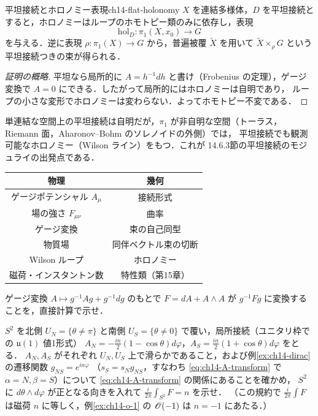 \begin{myprop}{平坦接続とホロノミー表現}{ch14-flat-holonomy}
$X$ を連結多様体，$D$ を平坦接続とすると，ホロノミーはループのホモトピー類のみに依存し，表現
\begin{equation}
  \mathrm{hol}_D:\pi_1(X,x_0)\to G
\end{equation}
を与える．逆に表現 $\rho:\pi_1(X)\to G$ から，普遍被覆 $\tilde X$ を用いて $\tilde X\times_\rho G$ という平坦接続つきの束が得られる．
\end{myprop}
\begin{proof}[証明の概略]
平坦なら局所的に $A=h^{-1}dh$ と書け（Frobenius の定理），ゲージ変換で $A=0$ にできる．したがって局所的にはホロノミーは自明であり，
ループの小さな変形でホロノミーは変わらない．よってホモトピー不変である．
\end{proof}
単連結な空間上の平坦接続は自明だが，$\pi_1$ が非自明な空間（トーラス，Riemann 面，Aharonov--Bohm のソレノイドの外側）では，
平坦接続でも観測可能なホロノミー（Wilson ライン）をもつ．これが 14.6.3節の平坦接続のモジュライの出発点である．

\begin{physbox}
\begin{center}
\begin{tabular}{c|c}
物理 & 幾何 \\ \hline
ゲージポテンシャル $A_\mu$ & 接続形式 \\
場の強さ $F_{\mu\nu}$ & 曲率 \\
ゲージ変換 & 束の自己同型 \\
物質場 & 同伴ベクトル束の切断 \\
Wilson ループ & ホロノミー \\
磁荷・インスタントン数 & 特性類（第15章）
\end{tabular}
\end{center}
\end{physbox}

ゲージ変換 $A\mapsto g^{-1}Ag+g^{-1}dg$ のもとで $F=dA+A\wedge A$ が $g^{-1}Fg$ に変換することを，直接計算で示せ．

$S^2$ を北側 $U_N=\{\theta\neq\pi\}$ と南側 $U_S=\{\theta\neq0\}$ で覆い，局所接続（ユニタリ枠での $\mathfrak{u}(1)$ 値1形式）
$A_N = -\frac{in}{2}(1-\cos\theta)d\varphi$，$A_S=\frac{in}{2}(1+\cos\theta)d\varphi$ をとる．
$A_N,A_S$ がそれぞれ $U_N,U_S$ 上で滑らかであること，および例\ref{ex:ch14-dirac} の遷移関数 $g_{NS}=e^{in\varphi}$
（$s_S=s_Ng_{NS}$，すなわち \eqref{eq:ch14-A-transform} で $\alpha=N,\beta=S$）について \eqref{eq:ch14-A-transform} の関係にあることを確かめ，
$S^2$ に $d\theta\wedge d\varphi$ が正となる向きを入れて $\frac{i}{2\pi}\int_{S^2}F=n$ を示せ．
（この規約で $\frac{i}{2\pi}\int F$ は磁荷 $n$ に等しく，例\ref{ex:ch14-o-1} の $\mathscr{O}(-1)$ は $n=-1$ にあたる．）

